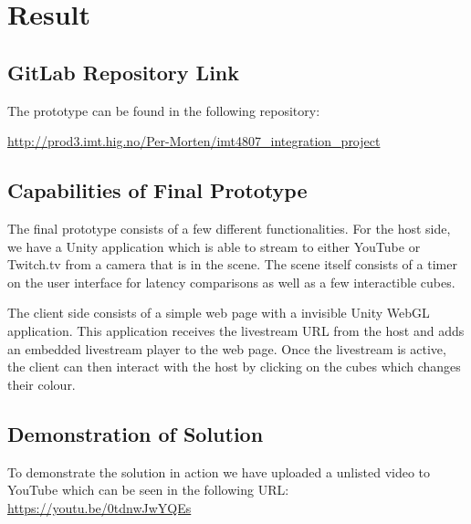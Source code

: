 \section{Result}

\subsection{GitLab Repository Link}
The prototype can be found in the following repository:

\url{http://prod3.imt.hig.no/Per-Morten/imt4807_integration_project}

\subsection{Capabilities of Final Prototype}
The final prototype consists of a few different functionalities. For the host side, we have a Unity application which is able to stream to either YouTube or Twitch.tv from a camera that is in the scene. The scene itself consists of a timer on the user interface for latency comparisons as well as a few interactible cubes. 

The client side consists of a simple web page with a invisible Unity WebGL application. This application receives the livestream URL from the host and adds an embedded livestream player to the web page. Once the livestream is active, the client can then interact with the host by clicking on the cubes which changes their colour. 

\subsection{Demonstration of Solution}
To demonstrate the solution in action we have uploaded a unlisted video to YouTube which can be seen in the following URL: \url{https://youtu.be/0tdnwJwYQEs}